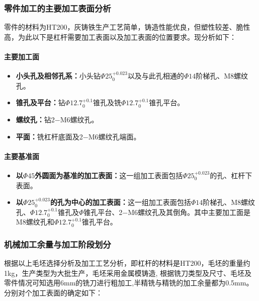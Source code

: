 \documentclass[12pt,a4paper,fontset=none]{ctexart}
\newcommand{\phitol}[3]{\ensuremath{\Phi #1^{#2}_{#3}}}
\begin{document}
    \subsubsection{\textbf{零件加工的主要加工表面分析}}

    零件的材料为HT200，灰铸铁生产工艺简单，铸造性能优良，但塑性较差、脆性高，为此以下是杠杆需要加工表面以及加工表面的位置要求。现分析如下：

    \paragraph{主要加工面}

    \begin{itemize}
        \item \textbf{小头孔及相邻孔系：}小头钻\phitol{25}{+0.023}{0}以及与此孔相通的$\Phi14$阶梯孔、M8螺纹孔。
        \item \textbf{锥孔及平台：}钻\phitol{12.7}{+0.1}{0}锥孔及铣\phitol{12.7}{+0.1}{0}锥孔平台。
        \item \textbf{螺纹孔：}钻2−M6螺纹孔。
        \item \textbf{平面：}铣杠杆底面及2−M6螺纹孔端面。
    \end{itemize}

    \paragraph{主要基准面}

    \begin{itemize}
        \item \textbf{以$\Phi45$外圆面为基准的加工表面：}这一组加工表面包括\phitol{25}{+0.023}{0}的孔、杠杆下表面。
        \item \textbf{以\phitol{25}{+0.023}{0}的孔为中心的加工表面：}这一组加工表面包括$\Phi14$阶梯孔、M8螺纹孔、\phitol{12.7}{+0.1}{0}锥孔及$\Phi$锥孔平台、2−M6螺纹孔及其倒角。其中主要加工面是M8螺纹孔和\phitol{12.7}{+0.1}{0}锥孔平台。
    \end{itemize}

    \subsubsection{机械加工余量与加工阶段划分}

    根据以上毛坯选择分析及加工工艺分析，即杠杆的材料是HT200，毛坯的重量约1kg，生产类型为大批生产，毛坯采用金属模铸造, 根据铣刀类型及尺寸、毛坯及零件情况可知选用6mm的铣刀进行粗加工,半精铣与精铣的加工余量都为0.5mm。分别对个加工表面的确定如下：
\end{document}
